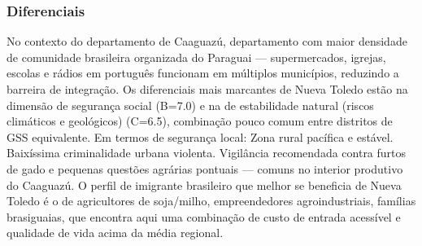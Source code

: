 \subsubsection*{Diferenciais}\label{dif-nueva-toledo-0522}
No contexto do departamento de Caaguazú, departamento com maior densidade de comunidade brasileira organizada do Paraguai — supermercados, igrejas, escolas e rádios em português funcionam em múltiplos municípios, reduzindo a barreira de integração. Os diferenciais mais marcantes de Nueva Toledo estão na dimensão de segurança social (B=7.0) e na de estabilidade natural (riscos climáticos e geológicos) (C=6.5), combinação pouco comum entre distritos de GSS equivalente. Em termos de segurança local: Zona rural pacífica e estável. Baixíssima criminalidade urbana violenta. Vigilância recomendada contra furtos de gado e pequenas questões agrárias pontuais — comuns no interior produtivo do Caaguazú. O perfil de imigrante brasileiro que melhor se beneficia de Nueva Toledo é o de agricultores de soja/milho, empreendedores agroindustriais, famílias brasiguaias, que encontra aqui uma combinação de custo de entrada acessível e qualidade de vida acima da média regional.
